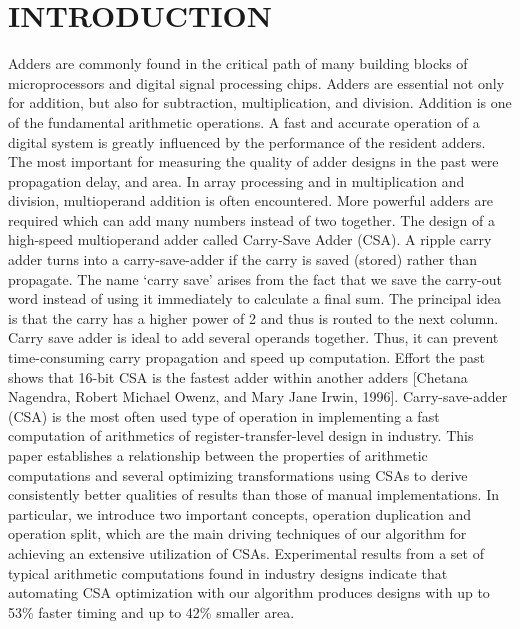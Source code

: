 \documentclass[12pt]{article}
\begin{document}
\section{INTRODUCTION}
Adders  are  commonly  found  in  the  critical path  of  many  building  blocks  of  microprocessors  and  digital  signal  processing  chips.  Adders  are  essential  not  only  for  addition,  but  also  for  subtraction,  multiplication,  and  division.  Addition  is  one  of  the  fundamental  arithmetic  operations.  A  fast  and  accurate  operation  of  a  digital  system  is  greatly  influenced  by  the  performance  of  the  resident  adders.  The  most  important  for  measuring the quality of adder designs in the past were propagation delay, and area.  In  array  processing  and  in  multiplication  and  division,  multioperand  addition  is  often  encountered.  More  powerful  adders  are  required  which  can  add  many  numbers  instead  of  two  together.  The  design  of  a  high-speed  multioperand  adder  called  Carry-Save  Adder  (CSA).  A  ripple  carry  adder  turns  into  a  carry-save-adder  if  the  carry  is  saved (stored) rather than propagate. The name ‘carry save’ arises from the fact that we save  the  carry-out  word  instead  of  using  it  immediately  to  calculate  a  final  sum.  The  principal  idea  is  that  the  carry  has  a  higher  power  of  2  and  thus  is  routed  to  the  next  column. Carry save adder is ideal to add several operands together. Thus, it can prevent time-consuming carry propagation and speed up computation. Effort the past shows that 16-bit  CSA  is  the  fastest  adder  within  another  adders  [Chetana  Nagendra,  Robert  Michael Owenz, and Mary Jane Irwin, 1996]. 
Carry-save-adder (CSA) is the most often used type of operation in implementing a fast computation of arithmetics of register-transfer-level design in industry. This paper establishes a relationship between the properties of arithmetic computations and several optimizing transformations using CSAs to derive consistently better qualities of results than those of manual implementations. In particular, we introduce two important concepts, operation duplication and operation split, which are the main driving techniques of our algorithm for achieving an extensive utilization of CSAs. Experimental results from a set of typical arithmetic computations found in industry designs indicate that automating CSA optimization with our algorithm produces designs with up to 53\% faster timing and up to 42\% smaller area.\cite{Intro}
\end{document}
